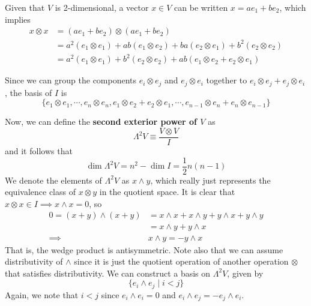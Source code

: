   \begin{example}
    Given that $V$ is 2-dimensional, a vector $x \in V$ can be written $x = a e_1 + b e_2$, which implies
    \begin{align*}
      x \otimes x & = (a e_1 + b e_2) \otimes (a e_1 + b e_2) \\
      & = a^2 (e_1 \otimes e_1) + a b (e_1 \otimes e_2) + b a (e_2 \otimes e_1) + b^2 (e_2 \otimes e_2) \\
      & = a^2 (e_1 \otimes e_1) + b^2 (e_2 \otimes e_2) + a b (e_1 \otimes e_2 + e_2 \otimes e_1) 
    \end{align*}
  \end{example}

  Since we can group the components $e_i \otimes e_j$ and $e_j \otimes e_i$ together to $e_i \otimes e_j + e_j \otimes e_i$, the basis of $I$ is 
  \[\{e_1 \otimes e_1, \cdots, e_n \otimes e_n, e_1 \otimes e_2 + e_2 \otimes e_1, \cdots, e_{n-1} \otimes e_n + e_n \otimes e_{n-1}\}\]

  \begin{definition}
    Now, we can define the \textbf{second exterior power of $V$} as
    \[\Lambda^2 V \equiv \frac{V \otimes V}{I}\]
    and it follows that 
    \[\dim{\Lambda^2 V} = n^2 - \dim{I} = \frac{1}{2} n (n-1)\]
    We denote the elements of $\Lambda^2 V$ as $x \wedge y$, which really just represents the equivalence class of $x \otimes y$ in the quotient space. It is clear that $x \otimes x \in I \implies x \wedge x = 0$, so
    \begin{align*}
        0 = (x + y) \wedge (x + y) & = x \wedge x + x \wedge y + y \wedge x + y \wedge y \\
        & = x \wedge y + y \wedge x \\
        \implies & x \wedge y = - y \wedge x
    \end{align*}
    That is, the wedge product is antisymmetric. Note also that we can assume distributivity of $\wedge$ since it is just the quotient operation of another operation $\otimes$ that satisfies distributivity. We can construct a basis on $\Lambda^2 V$, given by 
    \[\{e_i \wedge e_j \; | \; i < j\}\]
    Again, we note that $i < j$ since $e_i \wedge e_i = 0$ and $e_i \wedge e_j = - e_j \wedge e_i$. 
  \end{definition}


